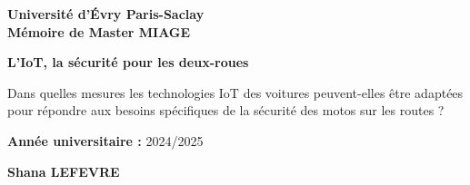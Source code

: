 \documentclass{article}
\begin{document}
\begin{titlepage}
  \centering
  \noindent{}

  \vspace{1.8cm}

  {\large \textbf{Université d'Évry Paris-Saclay}}\\[0.4cm]
  {\large \textbf{Mémoire de Master MIAGE}}%

  \vspace{1.4cm}

  {\LARGE \bfseries L’IoT, la sécurité pour les deux-roues\par}
  \vspace{0.7cm}
  \begin{minipage}{0.9\textwidth}
    \centering
    {\large
    Dans quelles mesures les technologies IoT des voitures peuvent-elles être
    adaptées pour répondre aux besoins spécifiques de la sécurité des motos sur les routes ?%
    }
  \end{minipage}

  \vspace{1.4cm}

  {\large \textbf{Année universitaire :} 2024/2025\par}
  \vspace{0.5cm}
  {\large \textbf{Shana \MakeUppercase{Lefevre}}\par}


\end{titlepage}
\end{document}
